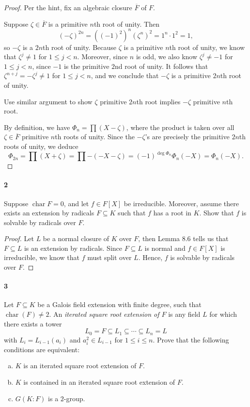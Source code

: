 \documentclass[12pt]{article}
\newlength{\myparskip}
\newenvironment{fullbox}{\begin{lrbox}{\savefullbox}\begin{minipage}{\dimexpr\textwidth-2\fboxsep\relax}\setlength{\parskip}{\myparskip}}{\end{minipage}\end{lrbox}\framebox[\textwidth]{\usebox{\savefullbox}}}
\newenvironment{pbox}[1][]{\begin{fullbox}\def\temp{#1}\ifx\temp\empty\else\paragraph{#1}\phantom{}\fi}{\end{fullbox}}
\theoremstyle{definition}
\newcommand{\<}{\langle}
\renewcommand{\>}{\rangle}
\newcommand{\clo}{\overline}
\newcommand{\seq}{\subseteq}
\newcommand{\Char}{\operatorname{char}}
\begin{document}
\begin{proof}
    Per the hint, fix an algebraic closure $\clo{F}$ of $F$.

    Suppose $\zeta \in \clo{F}$ is a primitive $n$th root of unity.
    Then
    \[
        (-\zeta)^{2n} = ((-1)^2)^n(\zeta^n)^2 = 1^n \cdot 1^2 = 1,
    \]
    so $-\zeta$ is a $2n$th root of unity.
    Because $\zeta$ is a primitive $n$th root of unity, we know that $\zeta^j \ne 1$ for $1 \leq j < n$.
    Moreover, since $n$ is odd, we also know $\zeta^j \ne -1$ for $1 \leq j < n$, since $-1$ is the primitive $2$nd root of unity.
    It follows that $\zeta^{n + j} = -\zeta^j \ne 1$ for $1 \leq j < n$, and we conclude that $-\zeta$ is a primitive $2n$th root of unity.

    Use similar argument to show $\zeta$ primitive $2n$th root implies $-\zeta$ primitive $n$th root.

    By definition, we have $\Phi_n = \prod (X - \zeta)$, where the product is taken over all $\zeta \in \clo{F}$ primitive $n$th roots of unity.
    Since the $-\zeta$'s are precisely the primitive $2n$th roots of unity, we deduce
    \[
        \Phi_{2n}
            = \prod(X + \zeta)
            = \prod -(-X - \zeta)
            = (-1)^{\deg\Phi_n} \Phi_n(-X)
            = \Phi_n(-X).
    \]
\end{proof}



\newpage
\begin{pbox}[2]
    Suppose $\Char F = 0$, and let $f \in F[X]$ be irreducible.
    Moreover, assume there exists an extension by radicals $F \seq K$ such that $f$ has a root in $K$.
    Show that $f$ is solvable by radicals over $F$.
\end{pbox}

\begin{proof}
    Let $L$ be a normal closure of $K$ over $F$, then Lemma 8.6 tells us that $F \seq L$ is an extension by radicals.
    Since $F \seq L$ is normal and $f \in F[X]$ is irreducible, we know that $f$ must split over $L$.
    Hence, $f$ is solvable by radicals over $F$.
\end{proof}



\newpage
\begin{pbox}[3]
    Let $F \seq K$ be a Galois field extension with finite degree, such that $\Char(F) \ne 2$.
    An \textit{iterated square root extension of $F$} is any field $L$ for which there exists a tower
    \[
        L_0 = F \seq L_1 \seq \cdots \seq L_n = L
    \]
    with $L_i = L_{i-1}(a_i)$ and $a_i^2 \in L_{i-1}$ for $1 \leq i \leq n$.
    Prove that the following conditions are equivalent:
    \begin{enumerate}[(a)]
        \item $K$ is an iterated square root extension of $F$.
        \item $K$ is contained in an iterated square root extension of $F$.
        \item $G(K : F)$ is a $2$-group.
    \end{enumerate}
\end{pbox}
\end{document}
